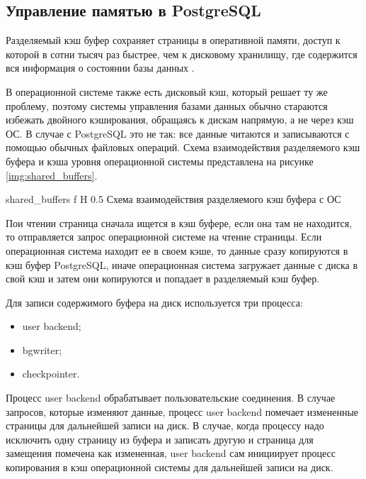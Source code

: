 \subsection{Управление памятью в PostgreSQL}

Разделяемый кэш буфер сохраняет страницы в оперативной памяти, доступ к которой в сотни тысяч раз быстрее, чем к дисковому хранилищу, где содержится вся информация о состоянии базы данных \cite{shaik2020postgresql}.

В операционной системе также есть дисковый кэш, который решает ту же проблему, поэтому системы управления базами данных обычно стараются избежать двойного кэширования, обращаясь к дискам напрямую, а не через кэш ОС. 
В случае с PostgreSQL это не так: все данные читаются и записываются с помощью обычных файловых операций.
Схема взаимодействия разделяемого кэш буфера и кэша уровня операционной системы представлена на рисунке \ref{img:shared_buffers}.

{shared_buffers} %
{f} %
{H} %
{0.5\textwidth} %
{Схема взаимодействия разделяемого кэш буфера с ОС} %

Пои чтении страница сначала ищется в кэш буфере, если она там не находится, то отправляется запрос операционной системе на чтение страницы.
Если операционная система находит ее в своем кэше, то данные сразу копируются в кэш буфер PostgreSQL, иначе операционная система загружает данные с диска в свой кэш и затем они копируются и попадает в разделяемый кэш буфер.

Для записи содержимого буфера на диск используется три процесса:
\begin{itemize}
	\item user backend;
	\item bgwriter;
	\item checkpointer.
\end{itemize}

Процесс user backend обрабатывает пользовательские соединения.
В случае запросов, которые изменяют данные, процесс user backend помечает измененные страницы для дальнейшей записи на диск.
В случае, когда процессу надо исключить одну страницу из буфера и записать другую и страница для замещения помечена как измененная, user backend сам инициирует процесс копирования в кэш операционной системы для дальнейшей записи на диск.

